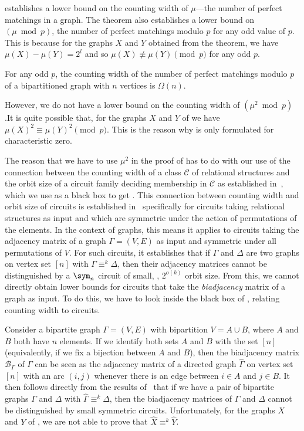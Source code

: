 \documentclass{toc}
\begin{document}
 establishes a lower bound on the counting width of $\mu$---the number of perfect matchings in a graph.  The theorem also establishes a lower bound on $(\mu \bmod p)$, the number of perfect matchings modulo $p$ for any odd value of $p$.  This is because for the graphs $X$ and $Y$ obtained from the theorem, we have $\mu(X) - \mu(Y) = 2^l$ and so $\mu(X) \not\equiv \mu(Y) \pmod p$ for any odd $p$.
\begin{corollary}\label{cor:modp-width}
  For any odd $p$, the counting width of the number of perfect matchings modulo $p$ of a bipartitioned graph with $n$ vertices is $\Omega(n)$.
\end{corollary}
However, we do not have a lower bound on the counting width of $(\mu^2 \bmod p)$.It is quite possible that, for the graphs $X$ and $Y$ of  we have $\mu(X)^2 \equiv \mu(Y)^2 \pmod p$.  This is the reason why  is only formulated for characteristic zero.

The reason that we have to use $\mu^2$ in the proof of
 has to do with our use of the
connection between the counting width of a class $\mathcal{C}$ of
relational structures and the orbit size of a circuit family deciding
membership in $\mathcal{C}$ as established in~\cite{AndersonD17},
which we use as a black box to get .  This
connection between counting width and orbit size of circuits is
established in~\cite{AndersonD17} specifically for circuits taking
relational structures as input and which are symmetric under the
action of permutations of the elements.  In the context of graphs, this means it applies to circuits taking the adjacency matrix of a graph $\Gamma = (V,E)$ as input and symmetric under all permutations of $V$.  For such circuits, it establishes that if $\Gamma$ and $\Delta$ are two graphs on vertex set $[n]$ with $\Gamma \equiv^k \Delta$, then their adjacency matrices cannot be distinguished by a $\sym_n$ circuit of small, \ie, $2^{o(k)}$ orbit size.  From this, we cannot directly obtain lower bounds for circuits that take the \emph{biadjacency} matrix of a graph as input.  To do this, we have to look inside the black box of , relating counting width to circuits.

Consider a bipartite graph $\Gamma= (V,E)$ with bipartition $V= A \cup B$,
where $A$ and $B$ both have $n$ elements.  If we identify both sets
$A$ and $B$ with the set $[n]$ (equivalently, if we fix a bijection
between $A$ and $B$), then the biadjacency matrix $\mathcal{B}_\Gamma$ of
$\Gamma$ can be seen as the adjacency matrix of a directed graph $\hat{\Gamma}$
on vertex set $[n]$ with an arc $(i,j)$ whenever there is an edge
between $i \in A$ and $j \in B$.  It then follows directly from the
results of~\cite{AndersonD17} that if we have a pair of bipartite graphs $\Gamma$ and $\Delta$ with $\hat{\Gamma} \equiv^k \hat{\Delta}$, then the biadjacency matrices of $\Gamma$ and $\Delta$ cannot be distinguished by small symmetric circuits.  Unfortunately, for the graphs $X$ and $Y$ of , we are not able to prove that $\hat{X} \equiv^k \hat{Y}$. 
\end{document}
